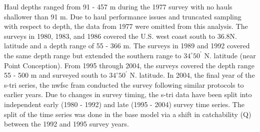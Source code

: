 \documentclass[11pt,
  english,
  a4paper,
]{article}
\begin{document}
\leavevmode\tagmcend\tagstructend\par


Haul depths ranged from 91 - 457 m during the 1977 survey with no hauls shallower than 91 m. Due to haul performance issues and truncated sampling with respect to depth, the data from 1977 were omitted from this analysis. The surveys in 1980, 1983, and 1986 covered the U.S. west coast south to 36.8\textdegree N. latitude and a depth range of 55 - 366 m. The surveys in 1989 and 1992 covered the same depth range but extended the southern range to {\(34^\circ 50^\prime\)\leavevmode\tagmcend\tagstructend} N. latitude (near Point Conception). From 1995 through 2004, the surveys covered the depth range 55 - 500 m and surveyed south to {\(34^\circ 50^\prime\)\leavevmode\tagmcend\tagstructend} N. latitude. In 2004, the final year of the \gls{s-tri} series, the \gls{nwfsc} \gls{fram} conducted the survey following similar protocols to earlier years. Due to changes in survey timing, the \gls{s-tri} data have been split into independent early (1980 - 1992) and late (1995 - 2004) survey time series. The split of the time series was done in the base model via a shift in catchability (Q) between the 1992 and 1995 survey years.

\leavevmode\tagmcend\tagstructend\par

\end{document}
